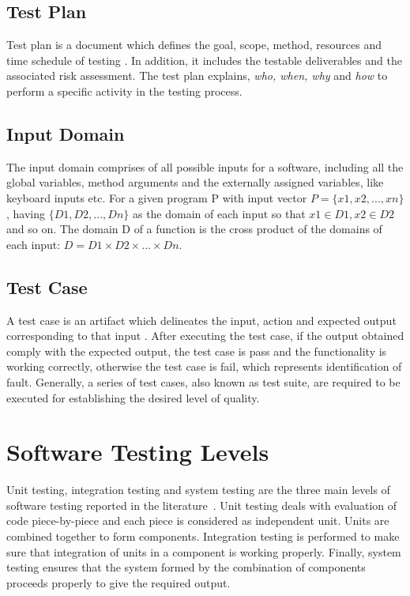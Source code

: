 \subsection{Test Plan}
Test plan is a document which defines the goal, scope, method, resources and time schedule of testing \cite{futrell2001quality}. In addition, it includes the testable deliverables and the associated risk assessment. The test plan explains, {\it {who, when, why}} and {\it {how}} to perform a specific activity in the testing process. 

\subsection{Input Domain} 
The input domain comprises of all possible inputs for a software, including all the global variables, method arguments and the externally assigned variables, like keyboard inputs etc. For a given program P with input vector $ P =\{x1, x2, . . . , xn\}$, having $\{D1, D2, . . . , Dn\}$ as the domain of each input so that $x1 \in D1, x2 \in D2$ and so on. The domain D of a function is the cross product of the domains of each input: $D = D1 \times D2 \times . . . \times Dn$.

\subsection{Test Case}
A test case is an artifact which delineates the input, action and expected output corresponding to that input \cite{ahmed2010software}. After executing the test case, if the output obtained comply with the expected output, the test case is pass and the functionality is working correctly, otherwise the test case is fail, which represents identification of fault. Generally, a series of test cases, also known as test suite, are required to be executed for establishing the desired level of quality.

\section{Software Testing Levels}
Unit testing, integration testing and system testing are the three main levels of software testing reported in the literature~\cite{chilenski1994applicability}. Unit testing deals with evaluation of code piece-by-piece and each piece is considered as independent unit. Units are combined together to form components. Integration testing is performed to make sure that integration of units in a component is working properly. Finally, system testing ensures that the system formed by the combination of components proceeds properly to give the required output.

